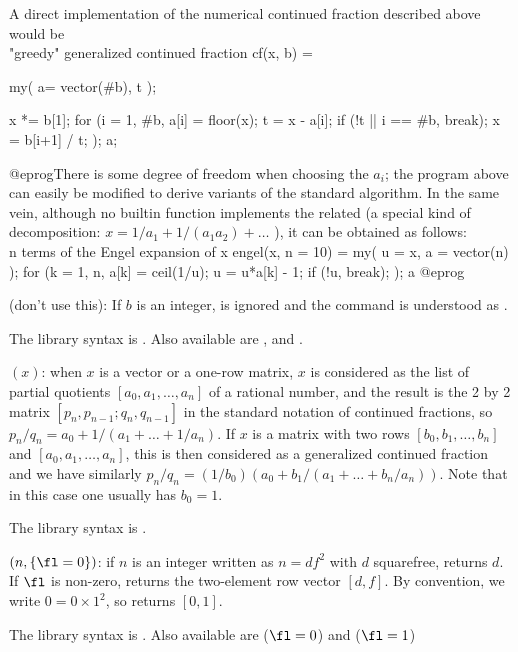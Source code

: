 A direct implementation of the numerical continued fraction
 described above would be
\bprog
\\ "greedy" generalized continued fraction
cf(x, b) =
{ my( a= vector(#b), t );

  x *= b[1];
  for (i = 1, #b,
    a[i] = floor(x);
    t = x - a[i]; if (!t || i == #b, break);
    x = b[i+1] / t;
  ); a;
}
@eprog\noindent There is some degree of freedom when choosing the $a_i$; the
program above can easily be modified to derive variants of the standard
algorithm. In the same vein, although no builtin
function implements the related  (a special kind of
 decomposition: $x = 1/a_1 + 1/(a_1a_2) + \dots$ ),
it can be obtained as follows:
\bprog
\\ n terms of the Engel expansion of x
engel(x, n = 10) =
{ my( u = x, a = vector(n) );
  for (k = 1, n,
    a[k] = ceil(1/u);
    u = u*a[k] - 1;
    if (!u, break);
  ); a
}
@eprog

 (don't use this): If $b$ is an integer, 
is ignored and the command is understood as .

The library syntax is .
Also available are ,
 and .

$(x)$: \label{se:contfracpnqn}when $x$ is a vector or a one-row matrix, $x$
is considered as the list of partial quotients $[a_0,a_1,\dots,a_n]$ of a
rational number, and the result is the 2 by 2 matrix
$[p_n,p_{n-1};q_n,q_{n-1}]$ in the standard notation of continued fractions,
so $p_n/q_n=a_0+1/(a_1+\dots+1/a_n)$. If $x$ is a matrix with two rows
$[b_0,b_1,\dots,b_n]$ and $[a_0,a_1,\dots,a_n]$, this is then considered as a
generalized continued fraction and we have similarly
$p_n/q_n=(1/b_0)(a_0+b_1/(a_1+\dots+b_n/a_n))$. Note that in this case one
usually has $b_0=1$.

The library syntax is .

$(n,\{\fl=0\})$: \label{se:core}if $n$ is an integer written as
$n=df^2$ with $d$ squarefree, returns $d$. If $\fl$ is non-zero,
returns the two-element row vector $[d,f]$. By convention, we write $0 = 0
\times 1^2$, so  returns $[0,1]$.

The library syntax is .
Also available are  ($\fl = 0$) and
 ($\fl = 1$)

